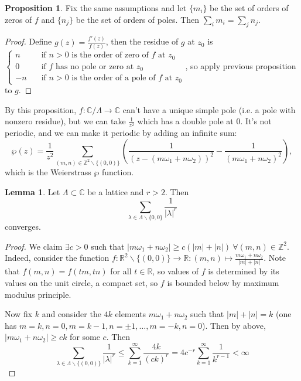 \documentclass{article}
\newcommand{\Z}{\mathbb{Z}}
\newcommand{\R}{\mathbb{R}}
\newcommand{\C}{\mathbb{C}}
\theoremstyle{definition}
\newtheorem{prop}[defn]{Proposition}
\newtheorem{lemma}[defn]{Lemma}
\begin{document}
\begin{prop}
Fix the same assumptions and let $\{m_i\}$ be the set of orders of zeros of $f$ and $\{n_j\}$ be the set of orders of poles. Then $\sum_im_i=\sum_jn_j$.
\end{prop}
\begin{proof}
Define $g(z)=\frac{f'(z)}{f(z)}$, then the residue of $g$ at $z_0$ is $\left\{\begin{aligned}
n\quad &\text{if }n>0\text{ is the order of zero of }f\text{ at }z_0 \\
0\quad &\text{if }f\text{ has no pole or zero at }z_0 \\
-n\quad &\text{if }n>0\text{ is the order of a pole of }f\text{ at }z_0
\end{aligned}\right.$, so apply previous proposition to $g$.
\end{proof}

By this proposition, $f:\C/\Lambda\rightarrow\C$ can't have a unique simple pole (i.e. a pole with nonzero residue), but we can take $\frac{1}{z^2}$ which has a double pole at 0. It's not periodic, and we can make it periodic by adding an infinite sum:
\[
\wp(z)=\frac{1}{z^2}\sum_{(m,n)\in\Z^2\backslash\{(0,0)\}} \left(\frac{1}{(z-(m\omega_1+n\omega_2))^2}-\frac{1}{(m\omega_1+n\omega_2)^2}\right),
\]
which is the Weierstrass $\wp$ function.

\begin{lemma}
Let $\Lambda\subset\C$ be a lattice and $r>2$. Then
\[
\sum_{\lambda\in\Lambda\backslash\{0,0\}}\frac{1}{|\lambda|^r}
\]
converges.
\end{lemma}
\begin{proof}
We claim $\exists c>0$ such that $|m\omega_1+n\omega_2|\geq c(|m|+|n|) \ \forall (m,n)\in\Z^2$. Indeed, consider the function $f:\R^2\backslash\{(0,0)\}\rightarrow\R:(m,n)\mapsto\frac{m\omega_1+n\omega_2}{|m|+|n|}$. Note that $f(m,n)=f(tm,tn)$ for all $t\in\R$, so values of $f$ is determined by its values on the unit circle, a compact set, so $f$ is bounded below by maximum modulus principle.

Now fix $k$ and consider the $4k$ elements $m\omega_1+n\omega_2$ such that $|m|+|n|=k$ (one has $m=k,n=0,m=k-1,n=\pm 1,\ldots,m=-k,n=0$). Then by above, $|m\omega_1+n\omega_2|\geq ck$ for some $c$. Then
\[
\sum_{\lambda\in\Lambda\backslash\{(0,0)\}}\frac{1}{|\lambda|^r}\leq\sum_{k=1}^{\infty}\frac{4k}{(ck)^r}=4c^{-r}\sum_{k=1}^\infty\frac{1}{k^{r-1}}<\infty
\]
\end{proof}
\end{document}
